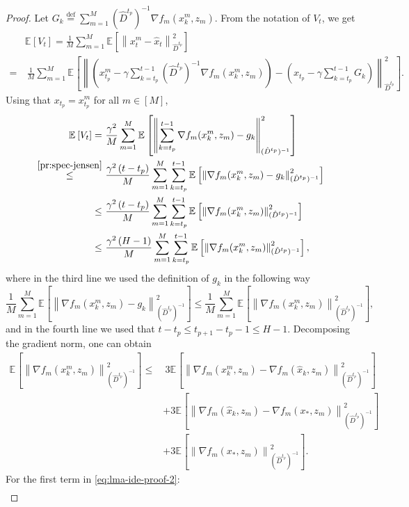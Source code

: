 \documentclass[sn-mathphys,Numbered]{sn-jnl}%
\renewcommand{\|}{\parallel}
\newcommand\ec[2][]{\ensuremath{\mathbb{E}_{#1} \left[#2\right]}}
\newcommand\ecn[3][]{\ec[#1]{\norm{#2}^2_{#3}}}
\newcommand\br[1]{\left ( #1 \right )}
\newcommand{\norm}[1]{\left\lVert#1\right\rVert}
\newcommand{\eqdef}{\overset{\text{def}}{=}}
\newcommand{\avemm}{\frac{1}{M}\sum\limits_{m=1}^M}
\renewcommand {\*} {\ast}
\begin{document}
\begin{proof}
    Let $G_k \eqdef \sum_{m=1}^M(\hat{D}^{t_p})^{-1}\nabla f_m(x_k^m, z_m)$. From the notation of $V_t$, we get
    \begin{align*}
        &\ec{V_t} = \frac{1}{M} \sum_{m=1}^{M} \ecn{x_t^m - \hat{x}_t}{\hat{D}^{t_p}} \\
        =&\ \frac{1}{M} \sum_{m=1}^{M} \ecn{ \br{x_{t_p}^{m} - \gamma \sum_{k=t_p}^{t-1} (\hat{D}^{t_p})^{-1}\nabla f_m(x_k^m, z_m) } - \br{x_{t_p} - \gamma \sum_{k=t_p}^{t-1} G_k} }{\hat{D}^{t_p}}.
    \end{align*}
    Using that $x_{t_p} = x_{t_p}^{m}$ for all $m \in \left[M\right]$,
    \begin{align}
    \label{eq:vt-bound}
        \ec{V_t} =&\ \frac{\gamma^2}{M} \sum_{m=1}^{M} \ecn{ \sum_{k=t_p}^{t-1} \nabla f_m(x_k^m, z_m) - g_k }{(\hat{D}^{t_p})^{-1}} \nonumber \\
        \overset{\eqref{pr:spec-jensen}}{\leq}&\ \frac{\gamma^2 \br{t - t_p}}{M} \sum_{m=1}^{M} \sum_{k=t_p}^{t-1} \ecn{\nabla f_m(x_k^m, z_m) - g_k}{(\hat{D}^{t_p})^{-1}} \nonumber \\ \leq&\ \frac{\gamma^2 \br{t - t_p}}{M} \sum_{m=1}^{M} \sum_{k=t_p}^{t-1} \ecn{\nabla f_m(x_k^m, z_m)}{(\hat{D}^{t_p})^{-1}} \nonumber \\
        \leq&\ \frac{\gamma^2 \br{H - 1}}{M} \sum_{m=1}^{M}  \sum_{k=t_p}^{t-1} \ecn{\nabla f_m(x_k^m, z_m)}{(\hat{D}^{t_p})^{-1}},
    \end{align}
    where in the third line we used the definition of 
 $g_k$ in the following way $$\avemm \ecn{\nabla f_m(x_k^m, z_m) - g_k}{(\hat{D}^{t_p})^{-1}} \leq \avemm \ecn{\nabla f_m(x_k^m, z_m)}{(\hat{D}^{t_p})^{-1}},$$ and in the fourth line we used that $t - t_p \leq t_{p+1} - t_p - 1 \leq H - 1$.  
    Decomposing the gradient norm, one can obtain
    \begin{align}
        \label{eq:lma-ide-proof-2}
        \ecn{\nabla f_m(x_k^m, z_m)}{(\hat{D}^{t_p})^{-1}} \nonumber \leq&\ 3 \ecn{\nabla f_m(x_k^m, z_m) - \nabla f_m (\hat{x}_k, z_m)}{(\hat{D}^{t_p})^{-1}} \nonumber \\&+ 3 \ecn{\nabla f_m (\hat{x}_k, z_m) - \nabla f_m (x_\ast, z_m)}{(\hat{D}^{t_p})^{-1}} \nonumber \\
        &+ 3 \ecn{\nabla f_m (x_\ast, z_m)}{(\hat{D}^{t_p})^{-1}}.
    \end{align}
    For the first term in \eqref{eq:lma-ide-proof-2}:
    \begin{align}
        \label{eq:lma-ide-proof-3}

\end{align}
\end{proof}
\end{document}
